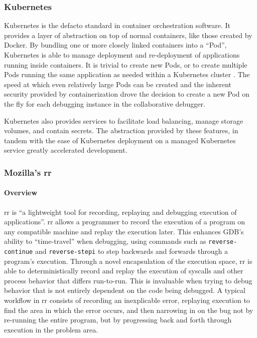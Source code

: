 \documentclass[12pt]{article}
\begin{document}
\subsubsection{Kubernetes}\label{k8s}

Kubernetes is the defacto standard in container orchestration
software.  It provides a layer of abstraction on top of normal
containers, like those created by Docker.  By bundling one or more
closely linked containers into a ``Pod'', Kubernetes is able to manage
deployment and re-deployment of applications running inside
containers.  It is trivial to create new Pods, or to create multiple
Pods running the same application as needed within a Kubernetes
cluster \cite{k8s}.  The speed at which even relatively large Pods can be created
and the inherent security provided by containerization drove the
decision to create a new Pod on the fly for each debugging instance in
the collaborative debugger.
\par

Kubernetes also provides services to facilitate load balancing, manage
storage volumes, and contain secrets.  The abstraction provided by
these features, in tandem with the ease of Kubernetes deployment on a
managed Kubernetes service\cite{do_managed_k8s} greatly accelerated
development.

\subsubsection{Mozilla's rr}\label{rr}

\paragraph{Overview}

rr is ``a lightweight tool for recording, replaying and debugging
execution of applications''\cite{rr-repo}. rr allows a programmer to
record the execution of a program on any compatible machine and replay
the execution later.  This enhances GDB's ability to ``time-travel''
when debugging, using commands such as \lstinline{reverse-continue}
and \lstinline{reverse-stepi}\cite{gdbman} to step backwards and
forwards through a program's execution.  Through a novel encapsulation
of the execution space, rr is able to deterministically record and
replay the execution of syscalls and other process behavior that
differs run-to-run.  This is invaluable when trying to debug behavior
that is not entirely dependent on the code being debugged.  A typical
workflow in rr consists of recording an inexplicable error, replaying
execution to find the area in which the error occurs, and then
narrowing in on the bug not by re-running the entire program, but by
progressing back and forth through execution in the problem area.
\par
\end{document}
